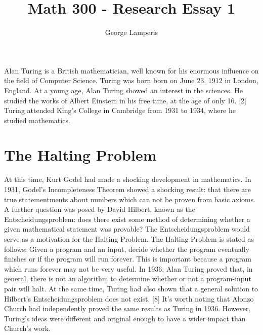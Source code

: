 \documentclass[12pt]{article}
\title{Math 300 - Research Essay 1}
\author{George Lamperis}
\date{}
\theoremstyle{mystyle}
\begin{document}
\maketitle

Alan Turing is a British mathematician, well known for his enormous influence on
the field of Computer Science. Turing was born born on June 23, 1912 in London,
England. At a young age, Alan Turing showed an interest in the sciences. He
studied the works of Albert Einstein in his free time, at the age of only 16.
[2] Turing attended King's College in Cambridge from 1931 to 1934, where he studied
mathematics. 

\section*{The Halting Problem}
At this time, Kurt Godel had made a shocking development in
mathematics. In 1931, Godel's Incompleteness Theorem showed a shocking result:
that there are true statementments about numbers which can not be proven from
basic axioms. A further question was posed by David Hilbert, known as the
Entscheidungsproblem: does there exist some method of determining whether a 
given mathematical statement was provable? The Entscheidungsproblem would serve
as a motivation for the Halting Problem. The Halting Problem is stated as
follows: Given a program and an input, decide whether the program eventually 
finishes or if the program will run forever. This is important because a program
which runs forever may not be very useful. In 1936, Alan Turing proved that, in 
general, there is not an algorithm to determine whether or not a program-input 
pair will halt. At the same time, Turing had also shown that a general solution
to Hilbert's Entscheidungsproblem does not exist. [8] It's worth noting that
Alonzo Church had independently proved the same results as Turing in 1936. However,
Turing's ideas were different and original enough to have a wider impact than
Church's work.
\end{document}
